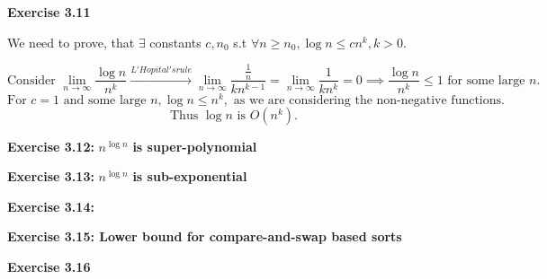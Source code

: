 \documentclass{article}
\begin{document}
\begin{framed}
    \noindent \textbf{Exercise 3.11}
    
    \medskip
    We need to prove, that $\exists $ constants $c,n_0$ s.t $\forall n \geq n_0, \log n \leq cn^{k}, k > 0$. 

    $$
    \text{Consider } \lim_{n \rightarrow \infty}{\frac{\log n}{n^{k}}} \xrightarrow[]{L'Hopital's rule} \lim_{n \rightarrow \infty}{\frac{\frac{1}{n}}{kn^{k-1}}} = \lim_{n \rightarrow \infty}{\frac{1}{kn^{k}}} = 0 \implies \frac{\log{n}}{n^k} \leq 1 \text{ for some large } n.
    $$
    $$
    \text{For } c = 1 \text{ and some large } n, \log{n} \leq n^{k}, \text{ as we are considering the non-negative functions}. 
    $$
    $$
    \text{Thus } \log{n} \text{ is } O(n^{k}).
    $$
    
\end{framed}

\bigskip

\begin{framed}
    \noindent \textbf{Exercise 3.12: } $n^{\log{n}}$ \textbf{ is super-polynomial}
    
    \medskip
    
    
\end{framed}

\bigskip

\begin{framed}
    \noindent \textbf{Exercise 3.13: } $n^{\log{n}}$ \textbf{ is sub-exponential}
    
    \medskip
    
    
\end{framed}

\bigskip

\begin{framed}
    \noindent \textbf{Exercise 3.14: }
    
    \medskip
    
    
\end{framed}

\bigskip

\begin{framed}
    \noindent \textbf{Exercise 3.15: Lower bound for compare-and-swap based sorts}
    
    \medskip
    
    
\end{framed}

\bigskip

\begin{framed}
    \noindent \textbf{Exercise 3.16}
    
    \medskip
    
    
\end{framed}
\end{document}
